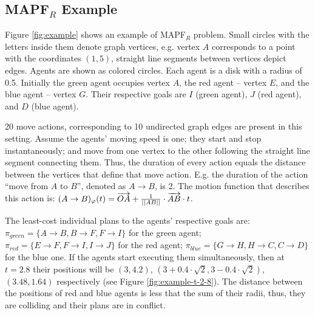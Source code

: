 \documentclass[review]{elsarticle}
\newcommand\konstantin[1]{\nb{\textbf{Konstantin:}}{red}{#1}}
\newcommand\roni[1]{\nb{\textbf{Roni:}}{green}{#1}}
\newcommand{\mapfr}{\ac{MAPF}$_R$\xspace}
\begin{document}
\subsection{\mapfr Example}
Figure \ref{fig:example} shows an example of \mapfr problem. 
Small circles with the letters inside them denote graph vertices, e.g. vertex $A$ corresponds to a point with the coordinates $(1, 5)$, straight line segments between vertices depict edges. %
Agents are shown as colored circles. Each agent is a disk with a radius of 0.5. Initially the green agent occupies vertex $A$, the red agent -- vertex $E$, and the blue agent -- vertex $G$. Their respective goals are $I$ (green agent), $J$ (red agent), and $D$ (blue agent).

20 move actions, corresponding to 10 undirected graph edges are present in this setting. Assume the agents' moving speed is one; they start and stop instantaneously; and move from one vertex to the other following the straight line segment connecting them. Thus, the duration of every action equals the distance between the vertices that define that move action. E.g. the duration of the action ``move from $A$ to $B$'', denoted as $A \rightarrow B$, is 2. The motion function that describes this action is: $(A \rightarrow B)_\varphi(t) = \overrightarrow{OA} + {1\over{||AB||}} \cdot \overrightarrow{AB} \cdot t$.

The least-cost individual plans to the agents' respective goals are: $\pi_{green}=\{A \rightarrow B, B \rightarrow F, F \rightarrow I\}$ for the green agent; $\pi_{red}=\{E \rightarrow F, F \rightarrow I, I \rightarrow J\}$ for the red agent; $\pi_{blue}=\{G \rightarrow H, H \rightarrow C, C \rightarrow D\}$ for the blue one. If the agents start executing them simultaneously, then at $t=2.8$ their positions will be $(3, 4.2)$, $(3+0.4\cdot \sqrt{2}, 3-0.4\cdot \sqrt{2})$, $(3.48, 1.64)$  respectively (see Figure \ref{fig:example-t-2-8}). The distance between the positions of red and blue agents is less that the sum of their radii, thus, they are colliding and their plans are in conflict. 

\end{document}
